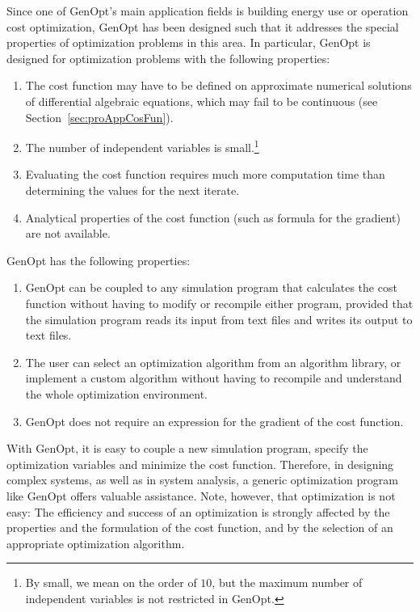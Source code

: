 Since one of GenOpt's main application fields is building energy use or 
operation cost optimization, 
GenOpt has been designed such that it addresses the special properties 
of optimization problems in this area.
In particular, GenOpt is designed for optimization problems with the following properties:
\begin{enumerate}
\item
The cost function may have to be defined on
approximate numerical solutions of 
differential algebraic equations,
which may fail to be continuous
(see Section~\ref{sec:proAppCosFun}).
\item
The number of independent variables is small.\footnote{By small, 
we mean on the order of $10$, but the maximum number of independent variables 
is not restricted in GenOpt.}
\item 
Evaluating the cost function requires much more computation time 
than determining the values for the next iterate.
\item 
Analytical properties of the cost function 
(such as formula for the gradient) are not available.
\end{enumerate}

\noindent GenOpt has the following properties:
\begin{enumerate}
\item 
GenOpt can be coupled to any simulation program that calculates 
the cost function 
without having to modify or recompile either program,
provided that the simulation program reads its input from text files 
and writes its output to text files.
\item 
The user can select an optimization algorithm from an algorithm library, 
or implement a custom algorithm without having 
to recompile and understand the whole optimization environment.
\item
GenOpt does not require an expression for the gradient of the cost function.
\end{enumerate}

With GenOpt, it is easy to couple a new simulation program, 
specify the optimization variables and minimize the cost function. 
Therefore, in designing complex systems, as well as in system analysis, 
a generic optimization program like GenOpt offers valuable assistance.
Note, however, that optimization is not easy:
The efficiency and success of an optimization is strongly affected by the properties and 
the formulation of the cost function, and by the selection of an appropriate optimization algorithm.\\

